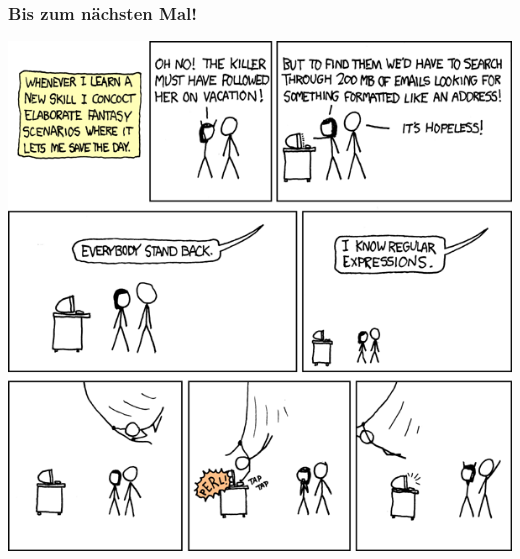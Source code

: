 \begin{frame}
\frametitle{Bis zum nächsten Mal!}
\vspace{-0.5cm}
\begin{center}\includegraphics[height=0.8\textheight]{images/regular_expressions.png}\end{center}
\end{frame}



